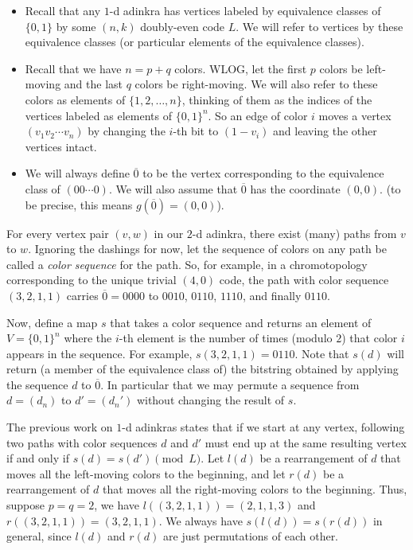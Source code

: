 \documentclass[12pt,twoside,singlespace]{article}
\numberwithin{equation}{section}
\theoremstyle{definition}
\begin{document}
\begin{itemize}
\item Recall that any $1$-d adinkra has vertices labeled by equivalence classes of $\{0,1\}$ by some $(n,k)$ doubly-even code $L$. We will refer to vertices by these equivalence classes (or particular elements of the equivalence classes). 
\item Recall that we have $n = p+q$ colors. WLOG, let the first $p$ colors be left-moving and the last $q$ colors be right-moving. We will also refer to these colors as elements of $\{1, 2, \ldots, n\}$, thinking of them as the indices of the vertices labeled as elements of $\{0, 1\}^n$. So an edge of color $i$ moves a vertex $(v_1 v_2 \cdots v_n)$ by changing the $i$-th bit to $(1 - v_i)$ and leaving the other vertices intact. 
\item We will always define $\overline{0}$ to be the vertex corresponding to the equivalence class of $(00\cdots0)$. We will also assume that $\overline{0}$ has the coordinate $(0,0)$. (to be precise, this means $g(\overline{0}) = (0,0)$).
\end{itemize}

For every vertex pair $(v,w)$ in our $2$-d adinkra, there exist (many) paths from $v$ to $w$. Ignoring the dashings for now, let the sequence of colors on any path be called a \emph{color sequence} for the path. So, for example, in a chromotopology corresponding to the unique trivial $(4,0)$ code, the path with color sequence $(3,2,1,1)$ carries $\overline{0} = 0000$ to $0010$, $0110$, $1110$, and finally $0110$. 

Now, define a map $s$ that takes a color sequence and returns an element of $V = \{0,1\}^n$ where the $i$-th element is the number of times (modulo $2$) that color $i$ appears in the sequence. For example, $s(3,2,1,1) = 0110$. Note that $s(d)$ will return (a member of the equivalence class of) the bitstring obtained by applying the sequence $d$ to $\overline{0}$.  In particular that we may permute a sequence from $d = (d_n)$ to $d' = (d_n')$ without changing the result of $s$. 

The previous work on $1$-d adinkras states that if we start at any vertex, following two paths with color sequences $d$ and $d'$ must end up at the same resulting vertex if and only if $s(d) = s(d') \pmod{L}$. Let $l(d)$ be a rearrangement of $d$ that moves all the left-moving colors to the beginning, and let $r(d)$ be a rearrangement of $d$ that moves all the right-moving colors to the beginning. Thus, suppose $p = q = 2$, we have $l((3,2,1,1)) = (2,1,1,3)$ and $r((3,2,1,1)) = (3,2,1,1)$. We always have $s(l(d)) = s(r(d))$ in general, since $l(d)$ and $r(d)$ are just permutations of each other.
\end{document}
